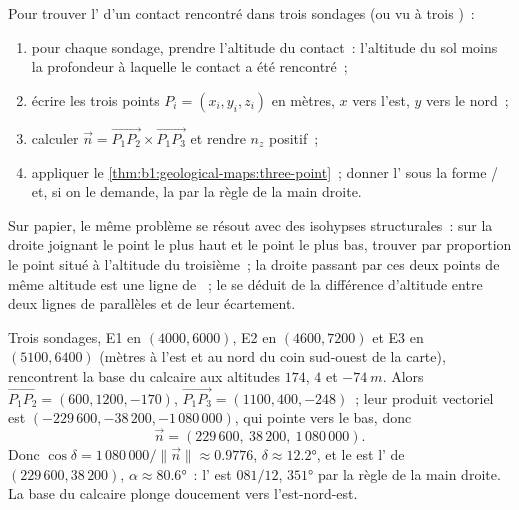 \begin{method}\label{met:b1:geological-maps:three-point}
Pour trouver l' d'un contact rencontré dans trois sondages (ou vu à
trois )~:
\begin{enumerate}
  \item pour chaque sondage, prendre l'altitude du contact~: l'altitude du sol
        moins la profondeur à laquelle le contact a été rencontré~;
  \item écrire les trois points $P_i = (x_i, y_i, z_i)$ en mètres, $x$ vers
        l'est, $y$ vers le nord~;
  \item calculer $\vec n = \overrightarrow{P_1P_2} \times
        \overrightarrow{P_1P_3}$ et rendre $n_z$ positif~;
  \item appliquer le \cref{thm:b1:geological-maps:three-point}~; donner
        l' sous la forme / et, si on le demande,
        la  par la règle de la main droite.
\end{enumerate}
Sur papier, le même problème se résout avec des isohypses structurales~: sur la
droite joignant le point le plus haut et le point le plus bas, trouver par
proportion le point situé à l'altitude du troisième~; la droite passant par ces
deux points de même altitude est une ligne de ~; le  se déduit
de la différence d'altitude entre deux lignes de  parallèles et de
leur écartement.
\end{method}

\begin{example}\label{ex:b1:geological-maps:east}
Trois sondages, E1 en $(4000, 6000)$, E2 en $(4600, 7200)$ et E3 en
$(5100, 6400)$ (mètres à l'est et au nord du coin sud-ouest de la carte),
rencontrent la base du calcaire aux altitudes $174$, $4$ et $\qty{-74}{m}$. Alors
$\overrightarrow{P_1P_2} = (600, 1200, -170)$,
$\overrightarrow{P_1P_3} = (1100, 400, -248)$~; leur produit vectoriel est
$(-229\,600, -38\,200, -1\,080\,000)$, qui pointe vers le bas, donc
\[
  \vec n = (229\,600,\ 38\,200,\ 1\,080\,000).
\]
Donc $\cos\delta = 1\,080\,000/\|\vec n\| \approx
0.9776$, $\delta \approx \ang{12.2}$, et le  est l' de
$(229\,600, 38\,200)$, $\alpha \approx \ang{80.6}$~: l' est
$081/12$,  $\ang{351}$ par la règle de la main droite. La base du
calcaire plonge doucement vers l'est-nord-est.
\end{example}

